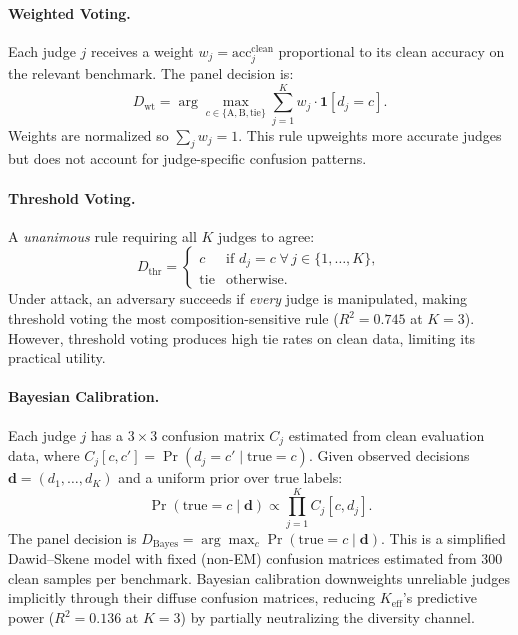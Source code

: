 \paragraph{Weighted Voting.} Each judge $j$ receives a weight $w_j = \text{acc}_j^{\text{clean}}$ proportional to its clean accuracy on the relevant benchmark. The panel decision is:
\begin{equation}
D_{\mathrm{wt}} = \arg\max_{c \in \{\text{A},\text{B},\text{tie}\}} \sum_{j=1}^{K} w_j \cdot \mathbf{1}[d_j = c].
\end{equation}
Weights are normalized so $\sum_j w_j = 1$. This rule upweights more accurate judges but does not account for judge-specific confusion patterns.

\paragraph{Threshold Voting.} A \emph{unanimous} rule requiring all $K$ judges to agree:
\begin{equation}
D_{\mathrm{thr}} = \begin{cases} c & \text{if } d_j = c \;\forall\, j \in \{1,\ldots,K\}, \\ \text{tie} & \text{otherwise}. \end{cases}
\end{equation}
Under attack, an adversary succeeds if \emph{every} judge is manipulated, making threshold voting the most composition-sensitive rule ($R^2{=}0.745$ at $K{=}3$). However, threshold voting produces high tie rates on clean data, limiting its practical utility.

\paragraph{Bayesian Calibration.} Each judge $j$ has a $3 \times 3$ confusion matrix $C_j$ estimated from clean evaluation data, where $C_j[c, c'] = \Pr(d_j {=} c' \mid \text{true} {=} c)$. Given observed decisions $\mathbf{d} = (d_1, \ldots, d_K)$ and a uniform prior over true labels:
\begin{equation}
\Pr(\text{true}{=}c \mid \mathbf{d}) \propto \prod_{j=1}^{K} C_j[c, d_j].
\end{equation}
The panel decision is $D_{\mathrm{Bayes}} = \arg\max_c \Pr(\text{true}{=}c \mid \mathbf{d})$. This is a simplified Dawid--Skene model \citep{dawid1979maximum} with fixed (non-EM) confusion matrices estimated from 300 clean samples per benchmark. Bayesian calibration downweights unreliable judges implicitly through their diffuse confusion matrices, reducing $K_{\mathrm{eff}}$'s predictive power ($R^2{=}0.136$ at $K{=}3$) by partially neutralizing the diversity channel.

